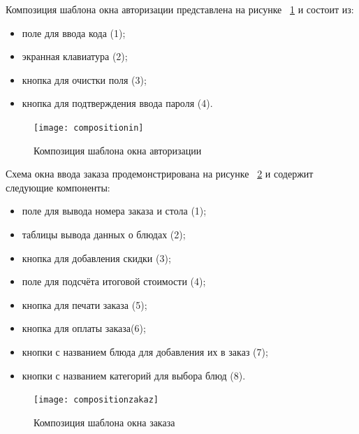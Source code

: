 Композиция шаблона окна авторизации представлена на рисунке ~\ref{compositionin:image} и состоит из:
\begin{itemize}
	\item поле для ввода кода (1);
	\item экранная клавиатура (2);
	\item кнопка для очистки поля (3);
	\item кнопка для подтверждения ввода пароля (4).
\end{itemize}
\begin{figure}[ht]
	\centering
	\texttt{[image: compositionin]}
	\caption{Композиция шаблона окна авторизации}
	\label{compositionin:image}
\end{figure}

Схема окна ввода заказа продемонстрирована на рисунке ~\ref{compositionzakaz:image} и содержит следующие компоненты:
\begin{itemize}
	\item поле для вывода номера заказа и стола (1);
	\item таблицы вывода данных о блюдах (2);
	\item кнопка для добавления скидки (3);
	\item поле для подсчёта итоговой стоимости (4);
	\item кнопка для печати заказа (5);
	\item кнопка для оплаты заказа(6);
	\item кнопки с названием блюда для добавления их в заказ (7);
	\item кнопки с названием категорий для выбора блюд (8).
\end{itemize}
\begin{figure}[ht]
	\centering
	\texttt{[image: compositionzakaz]}
	\caption{Композиция шаблона окна заказа}
	\label{compositionzakaz:image}
\end{figure} 

